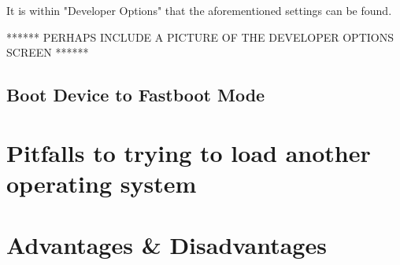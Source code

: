 It is within "Developer Options" that the aforementioned settings can be found.

****** PERHAPS INCLUDE A PICTURE OF THE DEVELOPER OPTIONS SCREEN ******

\subsection{Boot Device to Fastboot Mode}



\section{Pitfalls to trying to load another operating system}

\section{Advantages & Disadvantages}
